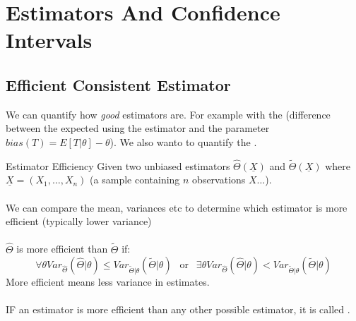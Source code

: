 \chapter{Estimators And Confidence Intervals}

\section{Efficient Consistent Estimator}
We can quantify how \textit{good} estimators are. For example with the  (difference
between the expected using the estimator and the parameter $bias(T) = E[T|\theta] - \theta$). We also wanto to
quantify the .
\begin{definitionbox}{Estimator Efficiency}
	Given two unbiased estimators $\hat{\Theta}(\underline{X})$ and $\tilde{\Theta}(\underline{X})$ where $\underline{X} = (X_1, \dots, X_n)$ (a sample containing $n$ observations $X\dots$).
	\\
	\\ We can compare the mean, variances etc to determine which estimator is more efficient (typically lower variance)
	\\
	\\ $\hat{\Theta}$ is more efficient than $\tilde{\Theta}$ if:
	\[\forall \theta Var_{\hat{\Theta}}(\hat{\Theta}| \theta) \leq Var_{\tilde{\Theta} | \theta}(\tilde{\Theta} | \theta) \
		\ \text{ or }
		\ \
		\exists \theta Var_{\hat{\Theta}}(\hat{\Theta}| \theta) < Var_{\tilde{\Theta} | \theta}(\tilde{\Theta} | \theta)
	\]
	More efficient means less variance in estimates.
	\\
	\\ IF an estimator is more efficient than any other possible estimator, it is called .
\end{definitionbox}

